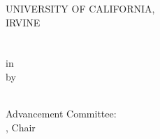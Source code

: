 \documentclass[onecolumn]{article}
\newcommand{\thesistitlepage}
{
	\vspace*{0.5in}
	\thispagestyle{empty}
	\begin{center}
		UNIVERSITY OF CALIFORNIA, \\
		IRVINE \\
		\vspace{0.4in}
		\Thesistitle \\
		\vspace{0.4in}
		\MakeUppercase\Degreename \\
		\vspace{0.15in}
		in \Degreefield \\
		\vspace{0.4in}
		by \\
		\vspace{0.4in}
		\Authorname \\
	\end{center}
	\vspace{3in}
	\begin{flushright}
		Advancement Committee: \\
		\Committeechair, Chair \\
		\Othercommitteemembers \\
	\end{flushright}
	\vfill
	\clearpage
}
\begin{document}


\thesistitlepage
\newpage

\tableofcontents

\newpage



%

\graphicspath{{Background/}}



\graphicspath{{ModelDevelopment/}}



\graphicspath{{Results/LocalStructuring/}}



\graphicspath{{Results/Electrostatics/}}



\graphicspath{{Results/SimultaneousBinding/}}



\graphicspath{{Results/SurfaceEffects/}}



\newpage

\graphicspath{{Timeline/}}




%
\newpage







\end{document}
